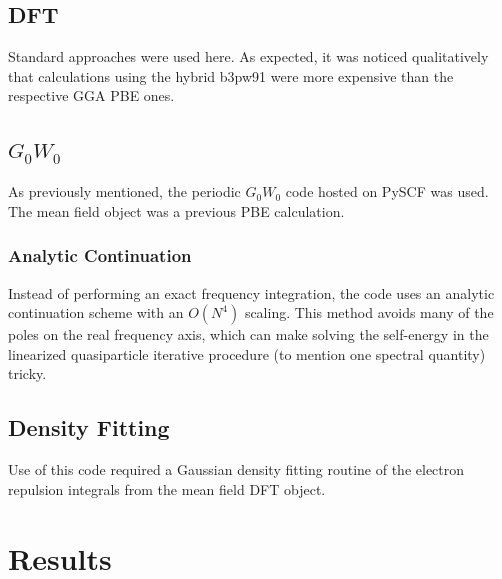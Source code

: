 \documentclass[12pt]{article}
\begin{document}
\subsection{DFT}
Standard approaches were used here. As expected, it was noticed qualitatively that calculations using the hybrid b3pw91 were more expensive than the respective GGA PBE ones.
\subsection{$G_0W_0$}
As previously mentioned, the periodic $G_0W_0$ code hosted on PySCF was used. The mean field object was a previous PBE calculation.
\subsubsection{Analytic Continuation}
Instead of performing an exact frequency integration, the code uses an analytic continuation scheme with an $O(N^4)$ scaling. This method avoids many of the poles on the real frequency axis, which can make solving the self-energy in the linearized quasiparticle iterative procedure (to mention one spectral quantity) tricky.
\subsection{Density Fitting}
Use of this code required a Gaussian density fitting routine of the  electron repulsion integrals from the mean field DFT object.
\section{Results}
\end{document}
